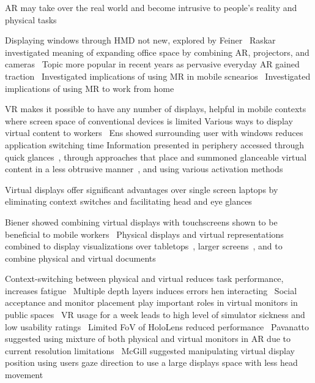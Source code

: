 AR may take over the real world and become intrusive to people's reality and physical tasks~\cite{lu2023inthewild}

Displaying windows through HMD not new, explored by Feiner~\cite{feiner1993windows}
Raskar investigated meaning of expanding office space by combining AR, projectors, and cameras~\cite{raskar1998officefuture}
Topic more popular in recent years as pervasive everyday AR gained traction~\cite{grubert2017pervasive,bellgardt2017vrwork,gruber2018officefuture}
Investigated implications of using MR in mobile scnearios~\cite{knierim2021nomadic,ofek2020practicalvirtualofficemobile}
Investigated implications of using MR to work from home~\cite{fereydooni2020virtual}

VR makes it possible to have any number of displays, helpful in mobile contexts where screen space of conventional devices is limited \cite{biener2024holdtight}
Various ways to display virtual content to workers~\cite{pavanatto2023virtualmonitor}
Ens showed surrounding user with windows reduces application switching time \cite{ens2014personalcockpit}
Information presented in periphery accessed through quick glances~\cite{davari2020occlusion}, through approaches that place and summoned glanceable virtual content in a less obtrusive manner~\cite{lu2020glanceable}, and using various activation methods~\cite{lu2021evaluatingglanceable}

Virtual displays offer significant advantages over single screen laptops by eliminating context switches and facilitating head and eye glances~\cite{pavanatto2024xrwild} 

Biener showed combining virtual displays with touchscreens shown to be beneficial to mobile workers~\cite{biener2020breakingscreen}
Physical displays and virtual representations combined to display visualizations over tabletops~\cite{butscher2018collaborativeanalysis}, larger screens~\cite{reipschlager2021arlargedisplaysinfovis,mahmood2017bdva}, and to combine physical and virtual documents~\cite{li2019holodoc}

Context-switching between physical and virtual reduces task performance, increases fatigue~\cite{gabbard2019arcontextswitch}
Multiple depth layers induces errors hen interacting~\cite{eiberger2019depth}
Social acceptance and monitor placement play important roles in virtual monitors in public spaces~\cite{ng2021passengerexperiencemrairplane,medeiros2022shieldingar}
VR usage for a week leads to high level of simulator sickness and low usability ratings~\cite{biener2022vrweek}
Limited FoV of HoloLens reduced performance~\cite{pavanatto2021virtualmonitor}
Pavanatto suggested using mixture of both physical and virtual monitors in AR due to current resolution limitations~\cite{pavanatto2021virtualmonitor}
McGill suggested manipulating virtual display position using users gaze direction to use a large displays space with less head movement~\cite{mcgill2020seatedvrworkspace} 


